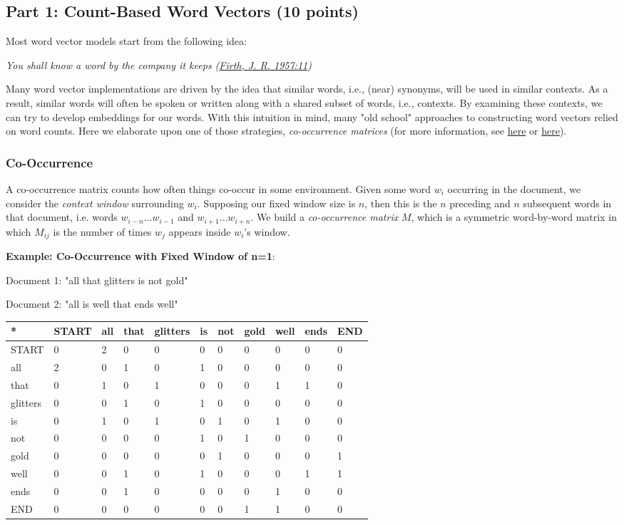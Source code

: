 \documentclass[11pt]{article}
\begin{document}
    \subsection{Part 1: Count-Based Word Vectors (10
points)}\label{part-1-count-based-word-vectors-10-points}

Most word vector models start from the following idea:

\emph{You shall know a word by the company it keeps
(\href{https://en.wikipedia.org/wiki/John_Rupert_Firth}{Firth, J. R.
1957:11})}

Many word vector implementations are driven by the idea that similar
words, i.e., (near) synonyms, will be used in similar contexts. As a
result, similar words will often be spoken or written along with a
shared subset of words, i.e., contexts. By examining these contexts, we
can try to develop embeddings for our words. With this intuition in
mind, many "old school" approaches to constructing word vectors relied
on word counts. Here we elaborate upon one of those strategies,
\emph{co-occurrence matrices} (for more information, see
\href{http://web.stanford.edu/class/cs124/lec/vectorsemantics.video.pdf}{here}
or
\href{https://medium.com/data-science-group-iitr/word-embedding-2d05d270b285}{here}).

    \subsubsection{Co-Occurrence}\label{co-occurrence}

A co-occurrence matrix counts how often things co-occur in some
environment. Given some word \(w_i\) occurring in the document, we
consider the \emph{context window} surrounding \(w_i\). Supposing our
fixed window size is \(n\), then this is the \(n\) preceding and \(n\)
subsequent words in that document, i.e. words \(w_{i-n} \dots w_{i-1}\)
and \(w_{i+1} \dots w_{i+n}\). We build a \emph{co-occurrence matrix}
\(M\), which is a symmetric word-by-word matrix in which \(M_{ij}\) is
the number of times \(w_j\) appears inside \(w_i\)'s window.

\textbf{Example: Co-Occurrence with Fixed Window of n=1}:

Document 1: "all that glitters is not gold"

Document 2: "all is well that ends well"

\begin{longtable}[]{@{}lllllllllll@{}}
\toprule
* & START & all & that & glitters & is & not & gold & well & ends &
END\tabularnewline
\midrule
\endhead
START & 0 & 2 & 0 & 0 & 0 & 0 & 0 & 0 & 0 & 0\tabularnewline
all & 2 & 0 & 1 & 0 & 1 & 0 & 0 & 0 & 0 & 0\tabularnewline
that & 0 & 1 & 0 & 1 & 0 & 0 & 0 & 1 & 1 & 0\tabularnewline
glitters & 0 & 0 & 1 & 0 & 1 & 0 & 0 & 0 & 0 & 0\tabularnewline
is & 0 & 1 & 0 & 1 & 0 & 1 & 0 & 1 & 0 & 0\tabularnewline
not & 0 & 0 & 0 & 0 & 1 & 0 & 1 & 0 & 0 & 0\tabularnewline
gold & 0 & 0 & 0 & 0 & 0 & 1 & 0 & 0 & 0 & 1\tabularnewline
well & 0 & 0 & 1 & 0 & 1 & 0 & 0 & 0 & 1 & 1\tabularnewline
ends & 0 & 0 & 1 & 0 & 0 & 0 & 0 & 1 & 0 & 0\tabularnewline
END & 0 & 0 & 0 & 0 & 0 & 0 & 1 & 1 & 0 & 0\tabularnewline
\bottomrule
\end{longtable}
\end{document}

